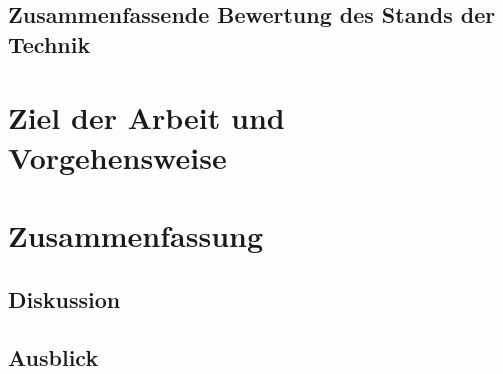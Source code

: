 \documentclass[%
english, ngerman,%
twoside, %
toc=bib,
BCOR=6mm, %
]{isw_smb_diss} %
\numberwithin{equation}{chapter} %
\begin{document}
\section{Zusammenfassende Bewertung des Stands der Technik}

\chapter{Ziel der Arbeit und Vorgehensweise}



\chapter{Zusammenfassung}
\section{Diskussion}
\section{Ausblick}

\nocite{*}

\setlength{\emergencystretch}{.5em}
\printbibliography[title={Literatur}]





\cleardoublepage
\appendix
\renewcommand{\thesection}{\Alph{section}} %
\renewcommand\thefigure{\thesection\arabic{figure}}
\renewcommand\thetable{\thesection\arabic{table}}
\end{document}
